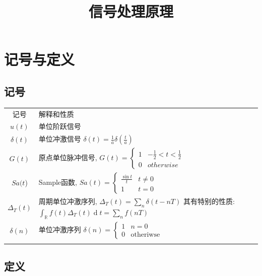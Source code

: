 \documentclass{ctexart}
\title{信号处理原理}
\DeclareMathOperator{\ud}{\mathrm{d}}
\DeclareMathOperator{\Rset}{\mathbb{R}}
\newlength{\Oldarrayrulewidth}
\newcommand{\Hline}[1]{
  \noalign{\global\setlength{\Oldarrayrulewidth}{\arrayrulewidth}}
  \noalign{\global\setlength{\arrayrulewidth}{#1}}\hline
  \noalign{\global\setlength{\arrayrulewidth}{\Oldarrayrulewidth}}}
\newcommand{\Topline}{\Hline{0.08em}}
\newcommand{\Bottomline}{\Hline{0.08em}}
\newcommand{\Midline}{\Hline{0.05em}}
\begin{document}
\maketitle

\tableofcontents

\section{记号与定义}
\subsection{记号}
    \begin{table}[ht!]
        \centering
        \begin{tabularx}{\textwidth}{|c|L|}
            \Topline
            记号 & 解释和性质 \\ \Midline
            $u(t)$ & 单位阶跃信号\\ \Midline
            $\delta(t)$ & 单位冲激信号 $\delta(t) = \frac{1}{a} \delta(\frac{t}{a})$ \\ \Midline
            $G(t)$ & 原点单位脉冲信号, $G(t) = \begin{cases}
                1 & -\frac{1}{2} < t < \frac{1}{2}\\
                0 & otherwise \end{cases}$
                \\ \Midline
            $Sa(t$) & Sample函数, $Sa(t) = \begin{cases}
                \frac{\sin t}{t} & t \neq 0 \\
                1 & t = 0 \end{cases}$ \\ \Midline
            $\Delta_{T} (t)$ & 周期单位冲激序列, $\Delta_T(t) = \sum_{n} \delta(t - n T)$\newline
                其有特别的性质: $\int_{\Rset} f(t) \Delta_T(t) \ud t = \sum_n f(nT)$
            \\ \Midline
            $\delta(n)$ & 单位冲激序列 $\delta(n) = \begin{cases}1 & n = 0 \\ 0 & \text{otheriwse}\end{cases}$ \\ \Bottomline
        \end{tabularx}
    \end{table}

\subsection{定义}
\end{document}
